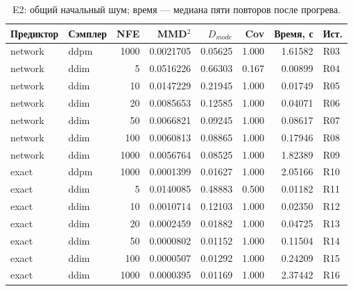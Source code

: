 \begin{table}[H]\centering\footnotesize
\setlength{\tabcolsep}{4pt}
\caption{E2: общий начальный шум; время --- медиана пяти повторов после прогрева.}\label{tab:sampling}
\begin{tabular}{llrrrrrl}
\toprule
Предиктор & Сэмплер & NFE & MMD$^2$ & $D_{mode}$ & Cov & Время, с & Ист. \\
\midrule
network & ddpm & 1000 & 0.0021705 & 0.05625 & 1.000 & 1.61582 & R03 \\
network & ddim & 5 & 0.0516226 & 0.66303 & 0.167 & 0.00899 & R04 \\
network & ddim & 10 & 0.0147229 & 0.21945 & 1.000 & 0.01749 & R05 \\
network & ddim & 20 & 0.0085653 & 0.12585 & 1.000 & 0.04071 & R06 \\
network & ddim & 50 & 0.0066821 & 0.09245 & 1.000 & 0.08617 & R07 \\
network & ddim & 100 & 0.0060813 & 0.08865 & 1.000 & 0.17946 & R08 \\
network & ddim & 1000 & 0.0056764 & 0.08525 & 1.000 & 1.82389 & R09 \\
exact & ddpm & 1000 & 0.0001399 & 0.01627 & 1.000 & 2.05166 & R10 \\
exact & ddim & 5 & 0.0140085 & 0.48883 & 0.500 & 0.01182 & R11 \\
exact & ddim & 10 & 0.0010714 & 0.12103 & 1.000 & 0.02350 & R12 \\
exact & ddim & 20 & 0.0002459 & 0.01882 & 1.000 & 0.04725 & R13 \\
exact & ddim & 50 & 0.0000802 & 0.01152 & 1.000 & 0.11504 & R14 \\
exact & ddim & 100 & 0.0000507 & 0.01292 & 1.000 & 0.24209 & R15 \\
exact & ddim & 1000 & 0.0000395 & 0.01169 & 1.000 & 2.37442 & R16 \\
\bottomrule
\end{tabular}
\end{table}

